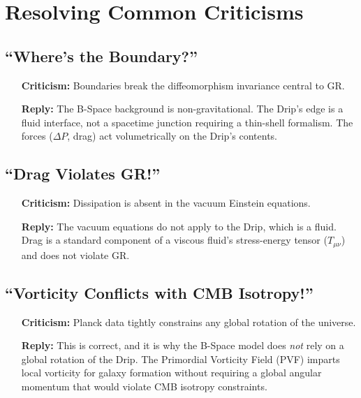 \documentclass{BSpacePaper} %
\begin{document}
\section{Resolving Common Criticisms}

\subsection{“Where’s the Boundary?”}
\begin{itemize}
    \item[\textbf{Criticism:}] Boundaries break the diffeomorphism invariance central to GR.
    \item[\textbf{Reply:}] The B-Space background is non-gravitational. The Drip’s edge is a fluid interface, not a spacetime junction requiring a thin-shell formalism. The forces (\(\Delta P\), drag) act volumetrically on the Drip's contents.
\end{itemize}

\subsection{“Drag Violates GR!”}
\begin{itemize}
    \item[\textbf{Criticism:}] Dissipation is absent in the vacuum Einstein equations.
    \item[\textbf{Reply:}] The vacuum equations do not apply to the Drip, which is a fluid. Drag is a standard component of a viscous fluid's stress-energy tensor ($T_{\mu\nu}$) and does not violate GR.
\end{itemize}

\subsection{“Vorticity Conflicts with CMB Isotropy!”}
\begin{itemize}
    \item[\textbf{Criticism:}] Planck data tightly constrains any global rotation of the universe.
    \item[\textbf{Reply:}] This is correct, and it is why the B-Space model does \textit{not} rely on a global rotation of the Drip. The Primordial Vorticity Field (PVF) imparts local vorticity for galaxy formation without requiring a global angular momentum that would violate CMB isotropy constraints.
\end{itemize}
\end{document}
